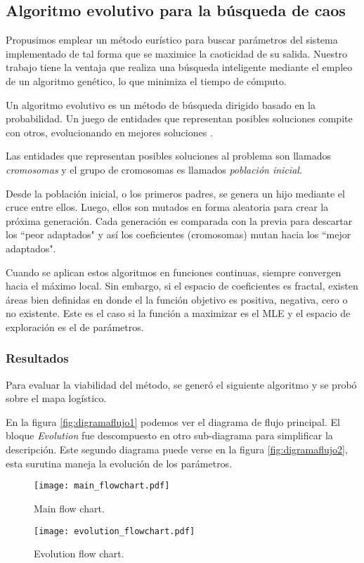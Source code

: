 \subsection{Algoritmo evolutivo para la búsqueda de caos}

Propusimos emplear un método eurístico para buscar parámetros del sistema implementado de tal forma que se maximice la caoticidad de su salida.
Nuestro trabajo tiene la ventaja que realiza una búsqueda inteligente mediante el empleo de un algoritmo genético, lo que minimiza el tiempo de cómputo.

Un algoritmo evolutivo es un método de búsqueda dirigido basado en la probabilidad.
Un juego de entidades que representan posibles soluciones compite con otros, evolucionando en mejores soluciones \cite{Weise2009}.

Las entidades que representan posibles soluciones al problema son llamados \textit{cromosomas} y el grupo de cromosomas es llamados \textit{población inicial}.

Desde la población inicial, o los primeros padres, se genera un hijo mediante el cruce entre ellos.
Luego, ellos son mutados en forma aleatoria para crear la próxima generación.
Cada generación es comparada con la previa para descartar los ``peor adaptados" y así los coeficientes (cromosomas) mutan hacia los ``mejor adaptados".

Cuando se aplican estos algoritmos en funciones continuas, siempre convergen hacia el máximo local.
Sin embargo, si el espacio de coeficientes es fractal, existen áreas bien definidas en donde el la función objetivo es positiva, negativa, cero o no existente.
Este es el caso si la función a maximizar es el MLE y el espacio de exploración es el de parámetros.

\subsubsection{Resultados}

Para evaluar la viabilidad del método, se generó el siguiente algoritmo y se probó sobre el mapa logístico.

En la figura \ref{fig:digramaflujo1} podemos ver el diagrama de flujo principal.
El bloque \textit{Evolution} fue descompuesto en otro sub-diagrama para simplificar la descripción.
Este segundo diagrama puede verse en la figura \ref{fig:digramaflujo2}, esta surutina maneja la evolución de los parámetros.
%
\begin{figure}
	\centering
	\texttt{[image: main\_flowchart.pdf]}\\
	\caption{Main flow chart.}\label{fig:diagramaflujo1}
\end{figure}
%
\begin{figure}
	\centering
	\texttt{[image: evolution\_flowchart.pdf]}\\
	\caption{Evolution flow chart.}\label{fig:diagramaflujo2}
\end{figure}

